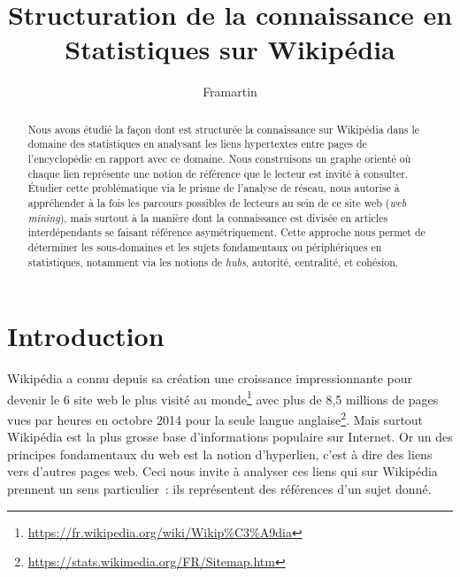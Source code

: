 \documentclass[a4paper]{article}
\title{Structuration de la connaissance en Statistiques sur Wikipédia}           %
\author{Framartin}
\date{}                       %
\begin{document}
\maketitle                    %

\begin{abstract}
Nous avons étudié la façon dont est structurée la connaissance sur Wikipédia dans le domaine des statistiques en analysant les liens hypertextes entre pages de l'encyclopédie en rapport avec ce domaine. Nous construisons un graphe orienté où chaque lien représente une notion de référence que le lecteur est invité à consulter. Étudier cette problématique via le prisme de l'analyse de réseau, nous autorise à appréhender à la fois les parcours possibles de lecteurs au sein de ce site web (\textit{web mining}), mais surtout à la manière dont la connaissance est divisée en articles interdépendants se faisant référence asymétriquement. Cette approche nous permet de déterminer les sous-domaines et les sujets fondamentaux ou périphériques en statistiques, notamment via les notions de \textit{hubs}, autorité, centralité, et cohésion.
\end{abstract}



\section{Introduction}               %

Wikipédia a connu depuis sa création une croissance impressionnante pour devenir le 6\ieme{} site web le plus visité au monde\footnote{\url{https://fr.wikipedia.org/wiki/Wikip\%C3\%A9dia}} avec plus de 8,5 millions de pages vues par heures en octobre 2014 pour la seule langue anglaise\footnote{\url{https://stats.wikimedia.org/FR/Sitemap.htm}}. Mais surtout Wikipédia est la plus grosse base d'informations populaire sur Internet. Or un des principes fondamentaux du web est la notion d'hyperlien, c'est à dire des liens vers d'autres pages web. Ceci nous invite à analyser ces liens qui sur Wikipédia prennent un sens particulier~: ils représentent des références d'un sujet donné.
\end{document}
